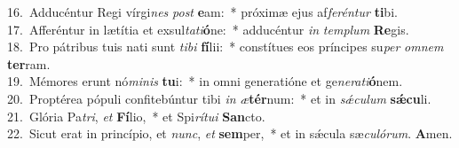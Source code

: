 {16.~}Adducéntur Regi vírgi\textit{nes} \textit{post} \textbf{e}am:~* próximæ ejus af\textit{fe}\textit{rén}\textit{tur} \textbf{ti}bi.\\
{17.~}Afferéntur in lætítia et exsul\textit{ta}\textit{ti}\textbf{ó}ne:~* adducéntur \textit{in} \textit{tem}\textit{plum} \textbf{Re}gis.\\
{18.~}Pro pátribus tuis nati sunt \textit{ti}\textit{bi} \textbf{fí}lii:~* constítues eos príncipes su\textit{per} \textit{om}\textit{nem} \textbf{ter}ram.\\
{19.~}Mémores erunt nó\textit{mi}\textit{nis} \textbf{tu}i:~* in omni generatióne et ge\textit{ne}\textit{ra}\textit{ti}\textbf{ó}nem.\\
{20.~}Proptérea pópuli confitebúntur tibi \textit{in} \textit{æ}\textbf{tér}num:~* et in \textit{sǽ}\textit{cu}\textit{lum} \textbf{sǽ}\textbf{cu}li.\\
{21.~}Glória Pa\textit{tri}, \textit{et} \textbf{Fí}lio,~* et Spi\textit{rí}\textit{tu}\textit{i} \textbf{San}cto.\\
{22.~}Sicut erat in princípio, et \textit{nunc}, \textit{et} \textbf{sem}per,~* et in sǽcula sæ\textit{cu}\textit{ló}\textit{rum}. \textbf{A}men.\\

